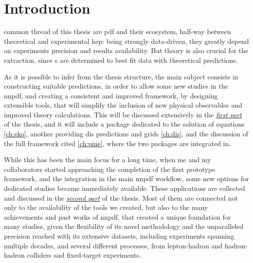 
\cleardoublepage
{}

\chapter*{Introduction}
%
	{}

 common thread of this thesis are \acrfull{pdf} and their
ecosystem, half-way between theoretical and experimental \acrfull{hep}: being
strongly data-driven, they greatly depend on experiments precision and results
availability.
But theory is also crucial for the extraction, since \pdf{}s are determined to
best fit data with theoretical predictions.

As it is possible to infer from the thesis structure, the main subject consists
in constructing suitable predictions, in order to allow some new studies
in the \acrlong{nnpdf}, and creating a consistent and improved framework, by
designing extensible tools, that will simplify the inclusion of new physical
observables and improved theory calculations.
This will be discussed extensively in the \hyperref[part:th]{\textit{first
part}} of the thesis, and it will include a package dedicated to the solution
of \dglap equations \cref{ch:eko}, another providing \acrfull{dis} predictions
and grids \cref{ch:dis}, and the discussion of the full framework cited
\cref{ch:pine}, where the two packages are integrated in.

While this has been the main focus for a long time, when me and my
collaborators started approaching the completion of the first prototype
framework, and the integration in the main \acrshort{nnpdf} workflow, some new
options for dedicated studies became immediately available.
These applications are collected and discussed in the
\hyperref[part:app]{\textit{second part}} of the thesis.
Most of them are connected not only to the availability of the tools we
created, but also to the many achievements and past works of \acrshort{nnpdf},
that created a unique foundation for many studies, given the flexibility of its
novel methodology and the unparalleled precision reached with its extensive
datasets, including experiments spanning multiple decades, and several
different processes, from lepton-hadron and hadron-hadron colliders and
fixed-target experiments.

